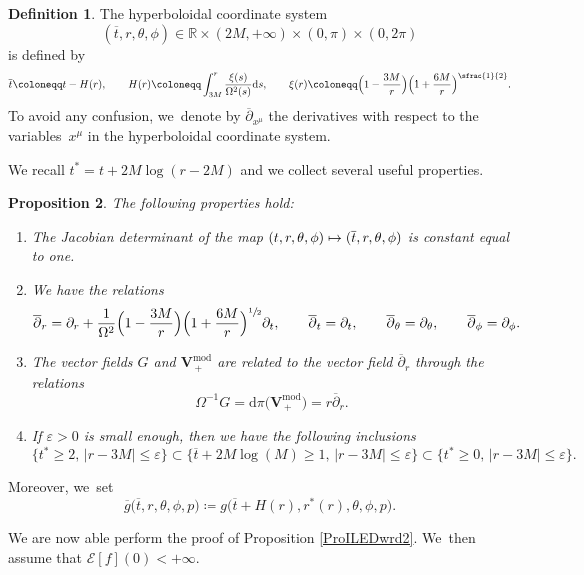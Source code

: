 \documentclass[10pt]{amsart}
\newcommand\mto{\mathchoice{\longmapsto}{\mapsto}{\mapsto}{\mapsto}}
\let\epsilon\varepsilon
\theoremstyle{plain}
\newtheorem{proposition}{Proposition}[section]
\theoremstyle{definition}
\newtheorem{definition}[proposition]{Definition}
\newcommand\R{{\mathbb{R}}}
\newcommand\dr{{\mathrm{d}}}
\begin{document}
\begin{definition}\label{Defhypcoor}
The hyperboloidal coordinate system
\[
(\overline{t},r,\theta, \phi) \in \R \times (2M,+\infty)\times (0, \pi) \times (0,2\pi)
\]
is defined by
\[
\overline{t} \coloneqq t-H(r), \qquad H(r)\coloneqq \int_{3M}^{r} \frac{\xi(s)}{\Omega^2(s)} \dr s, \qquad \xi(r) \coloneqq \Bigl(1-\frac{3M}{r} \Bigr)\Bigl(1+\frac{6M}{r}\Bigr)^{\sfrac{1}{2}}.
\]
To avoid any confusion, we~denote by $\overline{\partial}_{x^\mu}$ the derivatives with respect to the variables~$x^\mu$ in the hyperboloidal coordinate system.
\end{definition}
We recall $t^* = t+2M\log(r-2M)$ and we collect several useful properties.
\begin{proposition}\label{Prohyperboloidalcoord}
The following properties hold:
\begin{enumerate}
\item The Jacobian determinant of the map $(t,r,\theta, \phi) \mto (\overline{t},r,\theta, \phi)$ is constant equal to one.
\item We have the relations
\[
\overline{\partial}_r= \partial_r+\frac{1}{\Omega^2}\Bigl(1-\frac{3M}{r} \Bigr)\Bigl(1+\frac{6M}{r}\Bigr)^{\sfrac{1}{2}}\partial_t, \qquad \overline{\partial}_t = \partial_t, \qquad \overline{\partial}_\theta = \partial_\theta, \qquad \overline{\partial}_\phi = \partial_\phi.
\]
\item The vector fields $G$ and $\pmb{V}_{\, +}^{ \mathrm{mod}}$ are related to the vector field $\overline{\partial}_r$ through the relations
\[
\Omega^{-1}G=\dr \pi \bigl(\pmb{V}_{\, +}^{ \mathrm{mod}} \bigr)= r \overline{\partial}_r.
\]
\item If $\epsilon >0$ is small enough, then we have the following inclusions
\[
\bigl\{ t^* \geq 2, \, |r-3M| \leq \epsilon \bigr\} \! \subset \bigl\{ \overline{t}+2M\log(M) \geq 1, \, |r-3M| \leq \epsilon \bigr\} \! \subset \bigl\{ t^* \geq 0, \, |r-3M| \leq \epsilon \bigr\}.
\]
\end{enumerate}
\end{proposition}

Moreover, we~set
\[
\overline{g}\bigl(\overline{t},r,\theta,\phi,p\bigr)\coloneqq g\bigl(\overline{t}+H(r),r^*(r),\theta,\phi,p\bigr).
\]

We are now able perform the proof of Proposition \ref{ProILEDwrd2}. We~then assume that $\mathcal{E}[f](0)<+\infty$.
\end{document}
